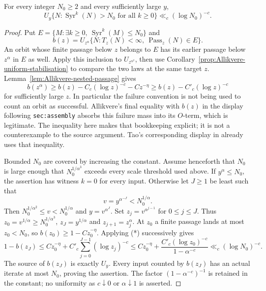 \begin{proposition}
\label{prop:Allikvere-untimed-ladder}
For every integer $N_0\ge2$ and every sufficiently large $y$,
\[
 U_y\{N:\operatorname{Syr}^k(N)>N_0\text{ for all }k\ge0\}
 \ll_c(\log N_0)^{-c}.
\]
\end{proposition}
\begin{proof}
Put $E=\{M:\exists k\ge0,\ \operatorname{Syr}^k(M)\le N_0\}$ and
\[
 b(z)=U_{z^\alpha}
 \{N:T_z(N)<\infty,\ \operatorname{Pass}_z(N)\in E\}.
\]
An orbit whose finite passage below $z$ belongs to $E$ has its
earlier passage below $z^\alpha$ in $E$ as well. Apply this inclusion
to $U_{z^{\alpha^2}}$, then use
Corollary~\ref{prop:Allikvere-uniform-stabilisation} to compare the two laws
at the same target $z$. Lemma~\ref{lem:Allikvere-nested-passage} gives
\[
 b(z^\alpha)\ge b(z)-C_c(\log z)^{-c}-Cz^{-\eta}
              \ge b(z)-C'_c(\log z)^{-c}                 \tag{*}
\]
for sufficiently large $z$. In particular the failure convention is
not being used to count an orbit as successful. Allikvere's final
equality with $b(z)$ in the display following \texttt{sec:assembly}
absorbs this failure mass into its $O$-term, which is legitimate.
The inequality here makes that bookkeeping explicit; it is not a
counterexample to the source argument. Tao's corresponding display in
\cite[\S3]{Tao2026v7} already uses that inequality.

Bounded $N_0$ are covered by increasing the constant. Assume henceforth
that $N_0$ is large enough that $N_0^{1/\alpha^3}$ exceeds every scale
threshold used above. If $y^\alpha\le N_0$, the assertion has witness
$k=0$ for every input. Otherwise let $J\ge1$ be least such that
\[
 v=y^{\alpha^{-J}}<N_0^{1/\alpha}.
\]
Then $N_0^{1/\alpha^2}\le v<N_0^{1/\alpha}$ and
$y=v^{\alpha^J}$. Set $z_j=v^{\alpha^{j-1}}$ for $0\le j\le J$.
Thus $z_0=v^{1/\alpha}\ge N_0^{1/\alpha^3}$,
$z_J=y^{1/\alpha}$ and $z_{j+1}=z_j^\alpha$.
At $z_0$ a finite passage lands at most $z_0<N_0$, so
$b(z_0)\ge1-Cz_0^{-\eta}$. Applying (*) successively gives
\[
 1-b(z_J)\le Cz_0^{-\eta}
   +C'_c\sum_{j=0}^{J-1}(\log z_j)^{-c}
 \le Cz_0^{-\eta}
   +\frac{C'_c(\log z_0)^{-c}}{1-\alpha^{-c}}
 \ll_c(\log N_0)^{-c}.
\]
The source of $b(z_J)$ is exactly $U_y$. Every input counted by $b(z_J)$
has an actual iterate at most $N_0$, proving the assertion.
The factor $(1-\alpha^{-c})^{-1}$ is retained in the constant; no
uniformity as $c\downarrow0$ or $\alpha\downarrow1$ is asserted.
\end{proof}

